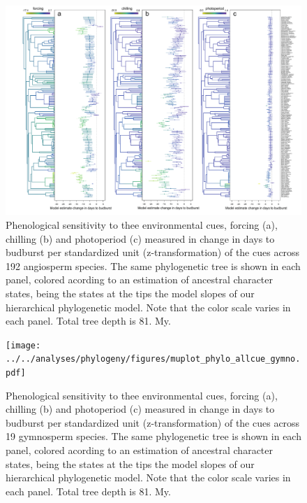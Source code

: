 \documentclass{article}\usepackage[]{graphicx}\usepackage[]{color}
\begin{document}
\begin{figure} [H]
  \begin{center}
  \includegraphics[width=16cm]{../../analyses/phylogeny/figures/muplot_phylo_allcue_angio.pdf}
  \caption{Phenological sensitivity to thee environmental cues, forcing (a), chilling (b) and photoperiod (c) measured in change in days to budburst per standardized unit (z-transformation) of the cues across 192 angiosperm species. The same phylogenetic tree is shown in each panel, colored acording to an estimation of ancestral character states, being the states at the tips the model slopes of our hierarchical phylogenetic model. Note that the color scale varies in each panel. Total tree depth is 81. My.}
  \label{fig:muplot_all}
  \end{center}
\end{figure}

\begin{figure} [H]
  \begin{center}
  \texttt{[image: ../../analyses/phylogeny/figures/muplot\_phylo\_allcue\_gymno.pdf]}
  \caption{Phenological sensitivity to thee environmental cues, forcing (a), chilling (b) and photoperiod (c) measured in change in days to budburst per standardized unit (z-transformation) of the cues across 19 gymnosperm species. The same phylogenetic tree is shown in each panel, colored acording to an estimation of ancestral character states, being the states at the tips the model slopes of our hierarchical phylogenetic model. Note that the color scale varies in each panel. Total tree depth is 81. My.}
  \label{fig:muplot_allgymno}
  \end{center}
\end{figure}
\end{document}
